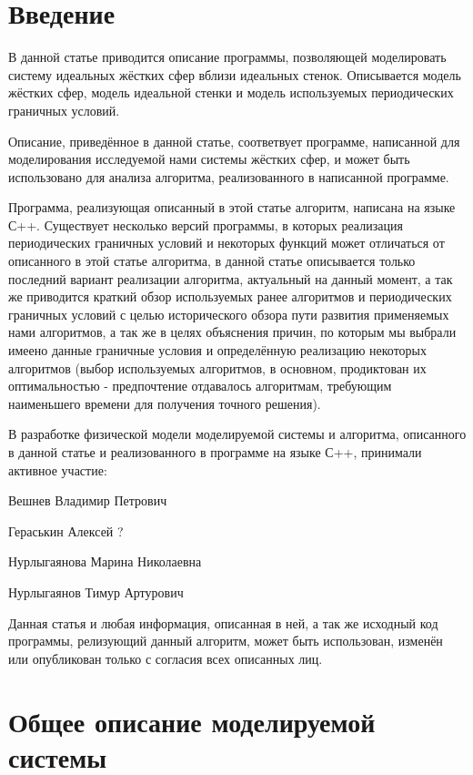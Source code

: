 \documentclass{article}
\begin{document}

\tableofcontents
\pagebreak

\section{Введение}

В данной статье приводится описание программы, позволяющей моделировать систему идеальных жёстких сфер вблизи идеальных стенок. Описывается модель жёстких сфер, модель идеальной стенки и модель используемых периодических граничных условий.

Описание, приведённое в данной статье, соответвует программе, написанной для моделирования исследуемой нами системы жёстких сфер, и может быть использовано для анализа алгоритма, реализованного в написанной программе.

Программа, реализующая описанный в этой статье алгоритм, написана на языке С++. Существует несколько версий программы, в которых реализация периодических граничных условий и некоторых функций может отличаться от описанного в этой статье алгоритма, в данной статье описывается только последний вариант реализации алгоритма, актуальный на данный момент, а так же приводится краткий обзор используемых ранее алгоритмов и периодических граничных условий с целью исторического обзора пути развития применяемых нами алгоритмов, а так же в целях объяснения причин, по которым мы выбрали имеено данные граничные условия и определённую реализацию некоторых алгоритмов (выбор используемых алгоритмов, в основном, продиктован их оптимальностью - предпочтение отдавалось алгоритмам, требующим наименьшего времени для получения точного решения).

В разработке физической модели моделируемой системы и алгоритма, описанного в данной статье и реализованного в программе на языке С++, принимали активное участие:

Вешнев Владимир Петрович

Гераськин Алексей ?

Нурлыгаянова Марина Николаевна

Нурлыгаянов Тимур Артурович

Данная статья и любая информация, описанная в ней, а так же исходный код программы, релизующий данный алгоритм, может быть использован, изменён или опубликован только с согласия всех описанных лиц.

\newpage
\section{Общее описание моделируемой системы}
\end{document}
